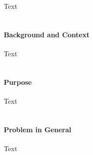~\\~\\~
Text
~\\~\\~\\~
{\large{\textbf{ Background and Context}}}
~\\~\\~
Text
~\\~\\~\\~
{\large{\textbf{ Purpose}}}
~\\~\\~
Text
~\\~\\~\\~
{\large{\textbf{ Problem in General }}}
~\\~\\~
Text
\clearpage